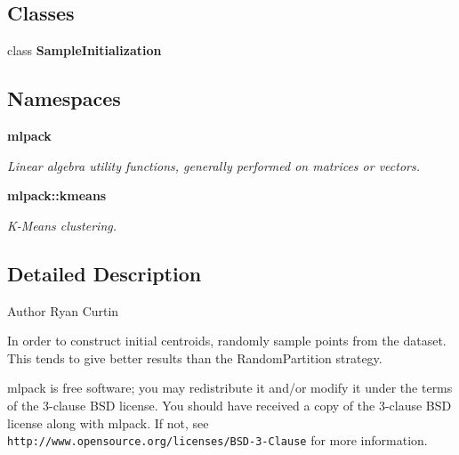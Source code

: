 \subsection*{Classes}
\begin{DoxyCompactItemize}
\item 
class \textbf{ Sample\+Initialization}
\end{DoxyCompactItemize}
\subsection*{Namespaces}
\begin{DoxyCompactItemize}
\item 
 \textbf{ mlpack}
\begin{DoxyCompactList}\small\item\em Linear algebra utility functions, generally performed on matrices or vectors. \end{DoxyCompactList}\item 
 \textbf{ mlpack\+::kmeans}
\begin{DoxyCompactList}\small\item\em K-\/\+Means clustering. \end{DoxyCompactList}\end{DoxyCompactItemize}


\subsection{Detailed Description}
\begin{DoxyAuthor}{Author}
Ryan Curtin
\end{DoxyAuthor}
In order to construct initial centroids, randomly sample points from the dataset. This tends to give better results than the Random\+Partition strategy.

mlpack is free software; you may redistribute it and/or modify it under the terms of the 3-\/clause B\+SD license. You should have received a copy of the 3-\/clause B\+SD license along with mlpack. If not, see {\tt http\+://www.\+opensource.\+org/licenses/\+B\+S\+D-\/3-\/\+Clause} for more information. 